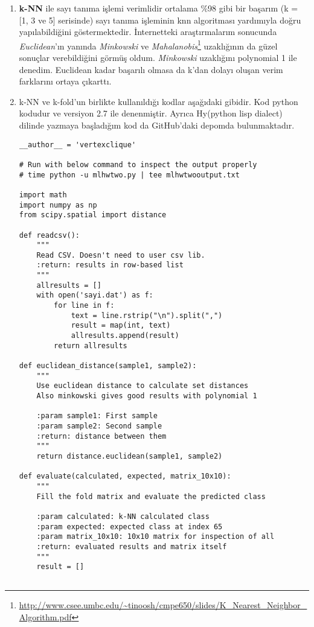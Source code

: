 \documentclass[11pt]{article}
\begin{document}
\begin{enumerate}[\indent a)]

\item
\textbf{k-NN} ile sayı tanıma işlemi verimlidir ortalama \%98 gibi bir başarım (k = [1, 3 ve 5] serisinde) sayı tanıma işleminin knn algoritması yardımıyla doğru yapılabildiğini göstermektedir. İnternetteki araştırmalarım sonucunda \textit{Euclidean}'ın yanında \textit{Minkowski} ve \textit{Mahalanobis}\footnote{\url{http://www.csee.umbc.edu/~tinoosh/cmpe650/slides/K_Nearest_Neighbor_Algorithm.pdf}} uzaklığının da güzel sonuçlar verebildiğini görmüş oldum. \textit{Minkowski} uzaklığını polynomial 1 ile denedim. Euclidean kadar başarılı olmasa da k'dan dolayı oluşan verim farklarını ortaya çıkarttı.

\item
k-NN ve k-fold'un birlikte kullanıldığı kodlar aşağıdaki gibidir. Kod python kodudur ve versiyon 2.7 ile denenmiştir. Ayrıca Hy(python lisp dialect) dilinde yazmaya başladığım kod da GitHub'daki depomda bulunmaktadır.

\begin{verbatim}
__author__ = 'vertexclique'

# Run with below command to inspect the output properly
# time python -u mlhwtwo.py | tee mlhwtwooutput.txt

import math
import numpy as np
from scipy.spatial import distance

def readcsv():
    """
    Read CSV. Doesn't need to user csv lib.
    :return: results in row-based list
    """
    allresults = []
    with open('sayi.dat') as f:
        for line in f:
            text = line.rstrip("\n").split(",")
            result = map(int, text)
            allresults.append(result)
        return allresults

def euclidean_distance(sample1, sample2):
    """
    Use euclidean distance to calculate set distances
    Also minkowski gives good results with polynomial 1

    :param sample1: First sample
    :param sample2: Second sample
    :return: distance between them
    """
    return distance.euclidean(sample1, sample2)

def evaluate(calculated, expected, matrix_10x10):
    """
    Fill the fold matrix and evaluate the predicted class

    :param calculated: k-NN calculated class
    :param expected: expected class at index 65
    :param matrix_10x10: 10x10 matrix for inspection of all
    :return: evaluated results and matrix itself
    """
    result = []


\end{verbatim}
\end{enumerate}
\end{document}
